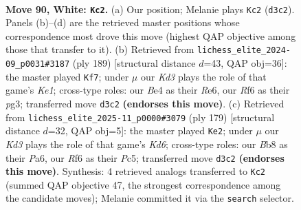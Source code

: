 \documentclass[11pt]{article}
\begin{document}
\clearpage

\begin{figure}[p]\centering
\begin{subfigure}{0.46\textwidth}\centering
\resizebox{\linewidth}{!}{%
\newchessgame
\chessboard[
  setfen={1B4k1/8/1P3R2/3N4/P3B1b1/3K3p/8/3r4 w - - 1 90},
  showmover=false,
  pgfstyle=straightmove, color=movearrow, markmove={d3-c2}
]}
\caption{}
\end{subfigure}\hfill
\begin{subfigure}{0.46\textwidth}\centering
\resizebox{\linewidth}{!}{%
\newchessgame
\chessboard[
  setfen={3Rk3/8/4r3/2P4p/7B/3K1bP1/8/8 b - - 6 95},
  showmover=false,
  pgfstyle=straightmove, color=movearrow, markmove={e8-f7}
]}
\caption{}
\end{subfigure}
\\[4pt]
\begin{subfigure}{0.46\textwidth}\centering
\resizebox{\linewidth}{!}{%
\newchessgame
\chessboard[
  setfen={8/2K5/p6R/Pbp5/8/n2k4/8/4B3 b - - 58 90},
  showmover=false,
  pgfstyle=straightmove, color=movearrow, markmove={d3-e2}
]}
\caption{}
\end{subfigure}\hfill

\caption{\textbf{Move 90, White: \texttt{Kc2}.} (a) Our position; Melanie plays \texttt{Kc2} (\texttt{d3c2}). Panels (b)--(d) are the retrieved master positions whose correspondence most drove this move (highest QAP objective among those that transfer to it). (b) Retrieved from \texttt{lichess\_elite\_2024-09\_p0031\#3187} (ply 189) [structural distance $d$=43, QAP obj=36]: the master played \texttt{Kf7}; under $\mu$ our \emph{Kd3} plays the role of that game's \emph{Ke1}; cross-type roles: our \emph{B}e4 as their \emph{R}e6, our \emph{R}f6 as their \emph{p}g3; transferred move \texttt{d3c2} \textbf{(endorses this move)}. (c) Retrieved from \texttt{lichess\_elite\_2025-11\_p0000\#3079} (ply 179) [structural distance $d$=32, QAP obj=5]: the master played \texttt{Ke2}; under $\mu$ our \emph{Kd3} plays the role of that game's \emph{Kd6}; cross-type roles: our \emph{B}b8 as their \emph{P}a6, our \emph{R}f6 as their \emph{P}c5; transferred move \texttt{d3c2} \textbf{(endorses this move)}. Synthesis: 4 retrieved analogs transferred to \texttt{Kc2} (summed QAP objective 47, the strongest correspondence among the candidate moves); Melanie committed it via the \texttt{search} selector.}
\label{fig:thought-m178}
\end{figure}

\clearpage
\end{document}
